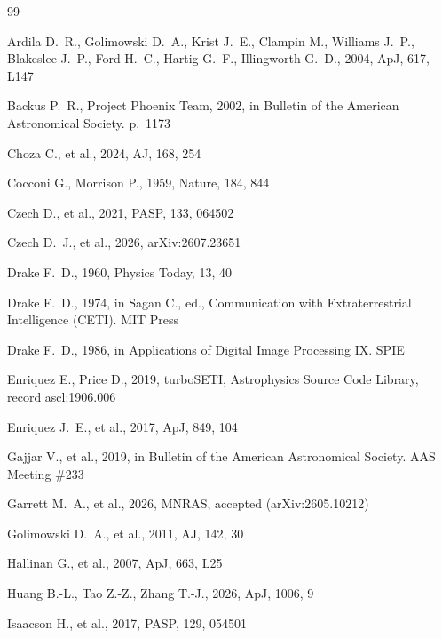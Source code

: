 \documentclass{openjournal}
\begin{document}
\begin{thebibliography}{99}

 Ardila D.~R., Golimowski D.~A., Krist J.~E., Clampin M., Williams J.~P., Blakeslee J.~P., Ford H.~C., Hartig G.~F., Illingworth G.~D., 2004, ApJ, 617, L147

 Backus P.~R., Project Phoenix Team, 2002, in Bulletin of the American Astronomical Society. p.\ 1173

 Choza C., et al., 2024, AJ, 168, 254

 Cocconi G., Morrison P., 1959, Nature, 184, 844

 Czech D., et al., 2021, PASP, 133, 064502

 Czech D.~J., et al., 2026, arXiv:2607.23651

 Drake F.~D., 1960, Physics Today, 13, 40

 Drake F.~D., 1974, in Sagan C., ed., Communication with Extraterrestrial Intelligence (CETI). MIT Press

 Drake F.~D., 1986, in Applications of Digital Image Processing IX. SPIE

 Enriquez E., Price D., 2019, turboSETI, Astrophysics Source Code Library, record ascl:1906.006

 Enriquez J.~E., et al., 2017, ApJ, 849, 104

 Gajjar V., et al., 2019, in Bulletin of the American Astronomical Society. AAS Meeting \#233

 Garrett M.~A., et al., 2026, MNRAS, accepted (arXiv:2605.10212)

 Golimowski D.~A., et al., 2011, AJ, 142, 30

 Hallinan G., et al., 2007, ApJ, 663, L25

 Huang B.-L., Tao Z.-Z., Zhang T.-J., 2026, ApJ, 1006, 9

 Isaacson H., et al., 2017, PASP, 129, 054501


\end{thebibliography}
\end{document}
